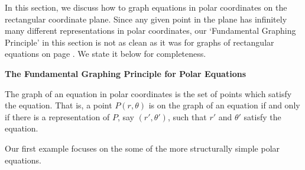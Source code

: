 

\setcounter{footnote}{0}

\label{PolarGraphs}

In this section, we discuss how to graph equations in polar coordinates on the rectangular coordinate plane.  Since any given point in the plane has infinitely many different representations in polar coordinates, our `Fundamental Graphing Principle' in this section is not as clean as it was for graphs of rectangular equations on page \pageref{fgp}.  We state it below for completeness.

\medskip

\colorbox{ResultColor}{\bbm

\smallskip

\centerline{\textbf{The Fundamental Graphing Principle for Polar Equations}} 

\label{fgpp}

The graph of an equation in polar coordinates is the set of points which satisfy the equation.  That is, a point $P(r,\theta)$ is on the graph of an equation if and only if there is a representation of $P$, say $\left(r',\theta'\right)$, such that $r'$ and $\theta'$ satisfy the equation.

\smallskip

\ebm}

\medskip

Our first example focuses on the some of the more structurally simple polar equations.

